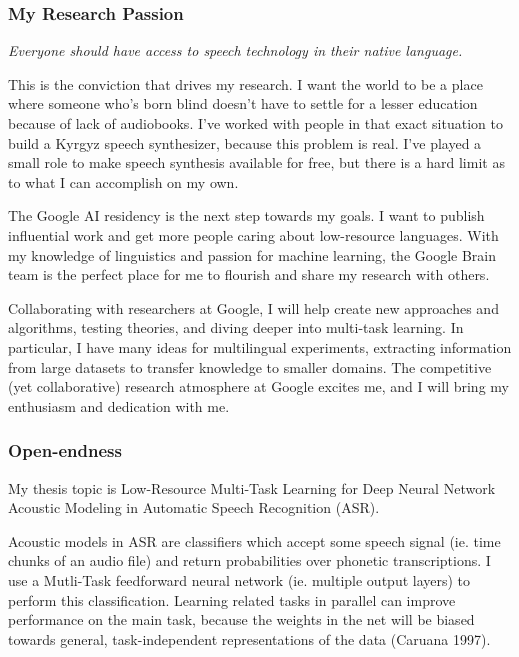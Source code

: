 \documentclass[12pt,a4paper]{article}
\begin{document}
\subsubsection*{My Research Passion}

\begin{center}
\textit{Everyone should have access to speech technology in their native language.}
\end{center}

This is the conviction that drives my research. I want the world to be a place where someone who's born blind doesn't have to settle for a lesser education because of lack of audiobooks. I've worked with people in that exact situation to build a Kyrgyz speech synthesizer, because this problem is real. I've played a small role to make speech synthesis available for free, but there is a hard limit as to what I can accomplish on my own.

The Google AI residency is the next step towards my goals. I want to publish influential work and get more people caring about low-resource languages. With my knowledge of linguistics and passion for machine learning, the Google Brain team is the perfect place for me to flourish and share my research with others.

Collaborating with researchers at Google, I will help create new approaches and algorithms, testing theories, and diving deeper into multi-task learning. In particular, I have many ideas for multilingual experiments, extracting information from large datasets to transfer knowledge to smaller domains. The competitive (yet collaborative) research atmosphere at Google excites me, and I will bring my enthusiasm and dedication with me. 


\subsubsection*{Open-endness}

My thesis topic is Low-Resource Multi-Task Learning for Deep Neural Network Acoustic Modeling in Automatic Speech Recognition (ASR).

Acoustic models in ASR are classifiers which accept some speech signal (ie. time chunks of an audio file) and return probabilities over phonetic transcriptions. I use a Mutli-Task feedforward neural network (ie. multiple output layers) to perform this classification. Learning related tasks in parallel can improve performance on the main task, because the weights in the net will be biased towards general, task-independent representations of the data (Caruana 1997).
\end{document}
